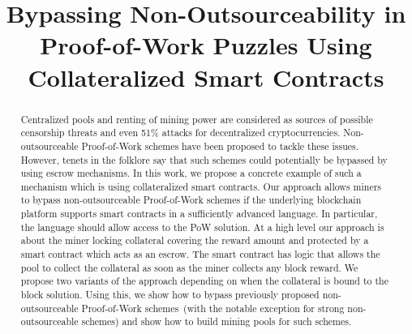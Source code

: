 \documentclass[11pt]{article}
\newcommand{\poolname}{ErgoPool\xspace}
\begin{document}
\title{Bypassing Non-Outsourceability in Proof-of-Work Puzzles Using Collateralized Smart Contracts}
\maketitle

\begin{abstract}
    Centralized pools and renting of mining power are considered as sources of possible censorship threats and even 51\%
    attacks for decentralized cryptocurrencies. Non-outsourceable Proof-of-Work schemes have been proposed to tackle these issues. However, tenets in the folklore say that such schemes could potentially be bypassed by using escrow mechanisms.
    In this work, we propose a concrete example of such a mechanism which is using collateralized smart contracts. Our approach allows miners to bypass non-outsourceable Proof-of-Work schemes
    if the underlying blockchain platform supports smart contracts in a sufficiently advanced language. In particular, the language
    should allow access to the PoW solution.
    At a high level our approach is about the miner locking collateral covering the reward amount and protected by a smart
    contract which acts as an escrow. The smart contract has logic that allows the pool to collect the collateral as soon as the miner collects any block reward. We propose two variants of the approach depending on when the collateral is bound to the block solution. Using this, we show how to bypass
    previously proposed non-outsourceable Proof-of-Work schemes~(with the notable exception for strong non-outsourceable schemes) 
     and show how to build mining pools for such schemes.

\end{abstract}
\end{document}
